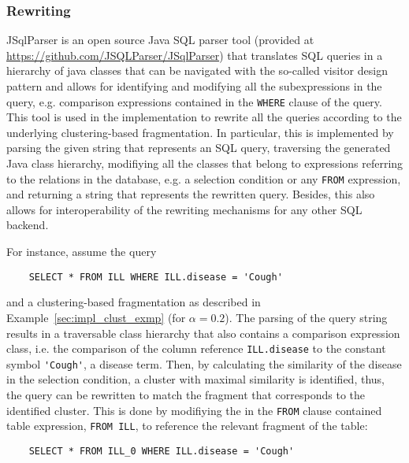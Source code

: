 \subsubsection{Rewriting}
\label{sec:impl_qpro_rewr}

JSqlParser is an open source Java SQL parser tool (provided at \url{https://github.com/JSQLParser/JSqlParser}) that translates SQL queries in a hierarchy 
of java classes that can be navigated with the so-called visitor design pattern \citep[pp.~331ff.]{Gamma1994} and allows for identifying and modifying all the
subexpressions in the query, e.g. comparison expressions contained in the \verb!WHERE! clause of the query. This tool is used in the implementation 
to rewrite all the queries according to the underlying clustering-based fragmentation. In particular, this is implemented by parsing the given string that 
represents an SQL query, traversing the generated Java class hierarchy, modifiying all the classes that belong to expressions referring to the relations in
the database, e.g. a selection condition or any \verb!FROM! expression, and returning a string that represents the rewritten query. Besides, this also allows
for interoperability of the rewriting mechanisms for any other SQL backend. 

\begin{exmp}
\label{sec:impl_qpro_exmp}
For instance, assume the query
\begin{verbatim}
    SELECT * FROM ILL WHERE ILL.disease = 'Cough'
\end{verbatim}
and a clustering-based fragmentation as described in Example~\ref{sec:impl_clust_exmp} (for $\alpha=0.2$). The parsing of the query string results in a 
traversable class hierarchy that also contains a comparison expression class, i.e. the comparison of the column reference \verb!ILL.disease! to the constant 
symbol \verb!'Cough'!, a disease term. Then, by calculating the similarity of the disease in the selection condition, a cluster with maximal similarity is
identified, thus, the query can be rewritten to match the fragment that corresponds to the identified cluster. This is done by modifiying the in the 
\verb!FROM! clause contained table expression, \verb!FROM ILL!, to reference the relevant fragment of the table:
\begin{verbatim}
    SELECT * FROM ILL_0 WHERE ILL.disease = 'Cough'
\end{verbatim}
\end{exmp}

